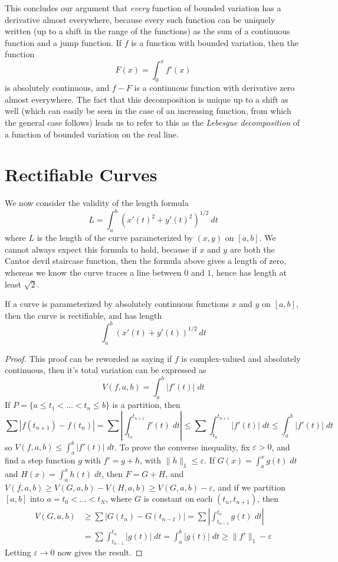 This concludes our argument that {\it every} function of bounded variation has a derivative almost everywhere, because every such function can be uniquely written (up to a shift in the range of the functions) as the sum of a continuous function and a jump function. If $f$ is a function with bounded variation, then the function
%
\[ F(x) = \int_0^x f'(x) \]
%
is absolutely continuous, and $f - F$ is a continuous function with derivative zero almost everywhere. The fact that this decomposition is unique up to a shift as well (which can easily be seen in the case of an increasing function, from which the general case follows) leads us to refer to this as the \emph{Lebesgue decomposition} of a function of bounded variation on the real line.

\section{Rectifiable Curves}

We now consider the validity of the length formula
%
\[ L = \int_a^b (x'(t)^2 + y'(t)^2)^{1/2}\ dt \]
%
where $L$ is the length of the curve parameterized by $(x,y)$ on $[a,b]$. We cannot always expect this formula to hold, because if $x$ and $y$ are both the Cantor devil staircase function, then the formula above gives a length of zero, whereas we know the curve traces a line between $0$ and $1$, hence has length at least $\sqrt{2}$.

\begin{theorem}
    If a curve is parameterized by absolutely continuous functions $x$ and $y$ on $[a,b]$, then the curve is rectifiable, and has length
    \[ \int_a^b (x'(t) + y'(t))^{1/2}\ dt \]
\end{theorem}
\begin{proof}
  This proof can be reworded as saying if $f$ is complex-valued and absolutely continuous, then it's total variation can be expressed as
  \[ V(f,a,b) = \int_a^b |f'(t)|\; dt \]
  If $P = \{ a \leq t_1 < \dots < t_n \leq b \}$ is a partition, then
  \[ \sum |f(t_{n+1}) - f(t_n)| = \sum \left| \int_{t_n}^{t_{n+1}} f'(t)\; dt \right| \leq \sum \int_{t_n}^{t_{n+1}} |f'(t)|\; dt \leq \int_a^b |f'(t)|\; dt \]
  so $V(f,a,b) \leq \int_a^b |f'(t)|\; dt$. To prove the converse inequality, fix $\varepsilon > 0$, and find a step function $g$ with $f' = g + h$, with $\| h \|_1 \leq \varepsilon$. If $G(x) = \int_a^x g(t)\; dt$ and $H(x) = \int_a^x h(t)\; dt$, then $F = G + H$, and $V(f,a,b) \geq V(G,a,b) - V(H,a,b) \geq V(G,a,b) - \varepsilon$, and if we partition $[a,b]$ into $a = t_0 < \dots < t_N$, where $G$ is constant on each $(t_n, t_{n+1})$, then
  \begin{align*}
    V(G,a,b) &\geq \sum |G(t_n) - G(t_{n-1})| = \sum \left| \int_{t_{n-1}}^{t_n} g(t)\; dt \right|\\
    &= \sum \int_{t_{n-1}}^{t_n} |g(t)|\; dt = \int_a^b |g(t)|\; dt \geq \| f' \|_1 - \varepsilon
  \end{align*}
  Letting $\varepsilon \to 0$ now gives the result.
\end{proof}

